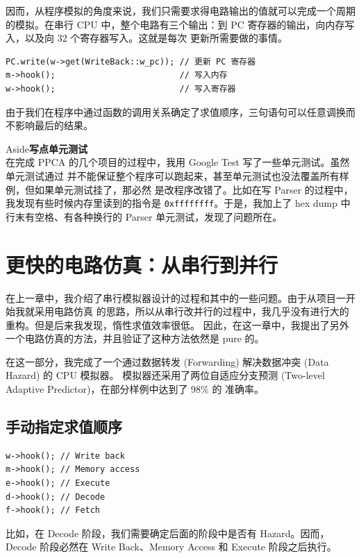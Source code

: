 \documentclass[12pt]{article}
\newenvironment{aside}[1]
    { \begin{tcolorbox}[enlarge top by=0.5cm, enlarge bottom by=0.5cm] Aside\space\space\space\space \textbf{#1} \\
        } { \end{tcolorbox} }
\begin{document}
    因而，从程序模拟的角度来说，我们只需要求得电路输出的值就可以完成一个周期的模拟。在串行 CPU
    中，整个电路有三个输出：到 PC 寄存器的输出，向内存写入，以及向 32 个寄存器写入。这就是每次
    更新所需要做的事情。

    \begin{verbatim}
PC.write(w->get(WriteBack::w_pc)); // 更新 PC 寄存器
m->hook();                         // 写入内存
w->hook();                         // 写入寄存器
    \end{verbatim}

    由于我们在程序中通过函数的调用关系确定了求值顺序，三句语句可以任意调换而不影响最后的结果。

    \begin{aside}{写点单元测试}
        在完成 PPCA 的几个项目的过程中，我用 Google Test 写了一些单元测试。虽然单元测试通过
        并不能保证整个程序可以跑起来，甚至单元测试也没法覆盖所有样例，但如果单元测试挂了，那必然
        是改程序改错了。比如在写 Parser 的过程中，我发现有些时候内存里读到的指令是 
        \texttt{0xffffffff}。于是，我加上了 hex dump 中行末有空格、有各种换行的 Parser
        单元测试，发现了问题所在。
    \end{aside}

    \section{更快的电路仿真：从串行到并行}

    在上一章中，我介绍了串行模拟器设计的过程和其中的一些问题。由于从项目一开始我就采用电路仿真
    的思路，所以从串行改并行的过程中，我几乎没有进行大的重构。但是后来我发现，惰性求值效率很低。
    因此，在这一章中，我提出了另外一个电路仿真的方法，并且验证了这种方法依然是 pure 的。
    
    在这一部分，我完成了一个通过数据转发 (Forwarding) 解决数据冲突 (Data Hazard) 的 CPU 模拟器。
    模拟器还采用了两位自适应分支预测 (Two-level Adaptive Predictor)，在部分样例中达到了 98\% 的
    准确率。

    \subsection{手动指定求值顺序}

    \begin{verbatim}
w->hook(); // Write back
m->hook(); // Memory access
e->hook(); // Execute
d->hook(); // Decode
f->hook(); // Fetch
    \end{verbatim}

    比如，在 Decode 阶段，我们需要确定后面的阶段中是否有 Hazard。因而，Decode 阶段必然在 Write Back、Memory Access 和 Execute 阶段之后执行。
\end{document}
